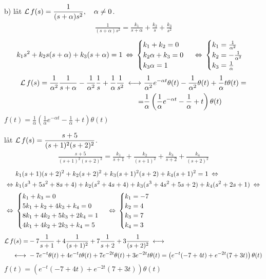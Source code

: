 \begin{task}{b)}
	låt $\operatorname{\mathcal{L}} f(s)=\dfrac{1}{(s+\alpha)s^2}, \quad \alpha \neq 0$.
	\begin{align*}
	\frac{1}{(s+\alpha)s^2}=
	\frac{k_1}{s+\alpha}+\frac{k_2}{s}+\frac{k_3}{s^2}
	\end{align*}
	\[k_1s^2+k_2s(s+\alpha)+k_3(s+\alpha)=1\lra
	\begin{cases}
	k_1+k_2=0 \\
	k_2\alpha +k_3=0 \\
	k_3\alpha=1
	\end{cases}\lra
	\begin{cases}
	k_1=\frac{1}{\alpha^2} \\
	k_2=-\frac{1}{\alpha^2} \\
	k_3=\frac{1}{\alpha}
	\end{cases}\]
	\begin{align*}
	\laplace f(s)=
	\frac{1}{\alpha^2}\*\frac{1}{s+\alpha}-\frac{1}{\alpha^2}\*\frac{1}{s}+\frac{1}{\alpha}\*\frac{1}{s^2} \llra
	&\frac{1}{\alpha^2}e^{-\alpha t}\theta(t)-\frac{1}{\alpha^2}\theta(t)+\frac{1}{\alpha}t\theta(t)= \\ =
	&\frac{1}{\alpha}\left(\frac{1}{\alpha}e^{-\alpha t}-\frac{1}{\alpha}+t\right)\theta(t)
	\end{align*}
	\ans $f(t)=\frac{1}{\alpha}\left(\frac{1}{\alpha}e^{-\alpha t}-\frac{1}{\alpha}+t\right)\theta(t)$
\end{task}

\begin{task}{4.14}
	låt $\operatorname{\mathcal{L}} f(s)=\dfrac{s+5}{(s+1)^2(s+2)^2}$.
	\begin{align*}
	\frac{s+5}{(s+1)^2(s+2)^2}=
	\frac{k_1}{s+1}+\frac{k_2}{(s+1)^2}+\frac{k_3}{s+2}+\frac{k_4}{(s+2)^2}
	\end{align*}
	\begin{align*}
	&k_1(s+1)(s+2)^2+k_2(s+2)^2+k_3(s+1)^2(s+2)+k_4(s+1)^2=1\lra \\ \lra
	&k_1(s^3+5s^2+8s+4)+k_2(s^2+4s+4)+k_3(s^3+4s^2+5s+2)+k_4(s^2+2s+1) \lra \\ \lra
	&\begin{cases}
	k_1+k_3=0 \\
	5k_1+k_2+4k_3+k_4=0 \\
	8k_1+4k_2+5k_3+2k_4=1 \\
	4k_1+4k_2+2k_3+k_4=5
	\end{cases}\lra
	\begin{cases}
	k_1=-7 \\
	k_2=4 \\
	k_3=7 \\
	k_4=3
	\end{cases}
	\end{align*}
	\begin{align*}
	\laplace f(s)=
	&-7\frac{1}{s+1}+4\frac{1}{(s+1)^2}+7\frac{1}{s+2}+3\frac{1}{(s+2)^2}\llra \\ \llra
	&-7e^{-t}\theta(t)+4e^{-t}t\theta(t)+7e^{-2t}\theta(t)+3e^{-2t}t\theta(t)=
	\left(e^{-t}(-7+4t)+e^{-2t}(7+3t)\right)\theta(t)
	\end{align*}
	\ans $f(t)=\left(e^{-t}(-7+4t)+e^{-2t}(7+3t)\right)\theta(t)$
\end{task}